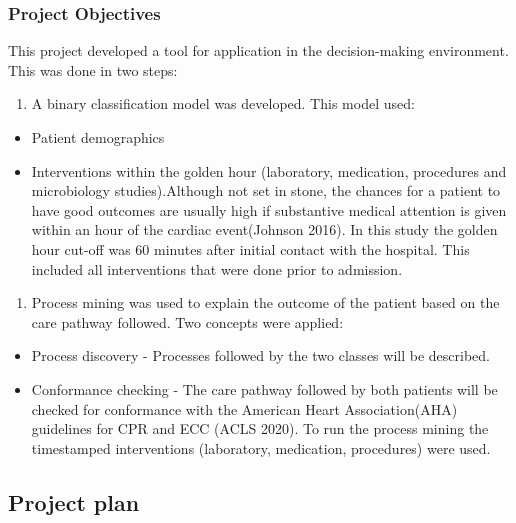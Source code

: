 \documentclass[
]{article}
\providecommand{\tightlist}{%
  \setlength{\itemsep}{0pt}\setlength{\parskip}{0pt}}
\begin{document}
\hypertarget{project-objectives}{%
\subsubsection{Project Objectives}\label{project-objectives}}

This project developed a tool for application in the decision-making
environment. This was done in two steps:

\begin{enumerate}
\def\labelenumi{\arabic{enumi}.}
\tightlist
\item
  A binary classification model was developed. This model used:
\end{enumerate}

\begin{itemize}
\tightlist
\item
  Patient demographics
\item
  Interventions within the golden hour (laboratory, medication,
  procedures and microbiology studies).Although not set in stone, the
  chances for a patient to have good outcomes are usually high if
  substantive medical attention is given within an hour of the cardiac
  event(Johnson 2016). In this study the golden hour cut-off was 60
  minutes after initial contact with the hospital. This included all
  interventions that were done prior to admission.
\end{itemize}

\begin{enumerate}
\def\labelenumi{\arabic{enumi}.}
\setcounter{enumi}{1}
\tightlist
\item
  Process mining was used to explain the outcome of the patient based on
  the care pathway followed. Two concepts were applied:
\end{enumerate}

\begin{itemize}
\tightlist
\item
  Process discovery - Processes followed by the two classes will be
  described.
\item
  Conformance checking - The care pathway followed by both patients will
  be checked for conformance with the American Heart Association(AHA)
  guidelines for CPR and ECC (ACLS 2020). To run the process mining the
  timestamped interventions (laboratory, medication, procedures) were
  used.
\end{itemize}

\hypertarget{project-plan}{%
\subsection{Project plan}\label{project-plan}}
\end{document}
